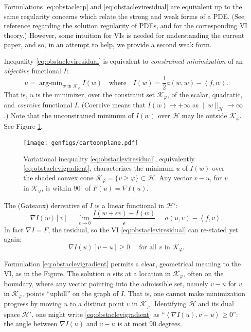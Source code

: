 \documentclass[letterpaper,final,12pt,reqno]{amsart}
\theoremstyle{claim}
\newcommand{\eps}{\epsilon}
\newcommand{\grad}{\nabla}
\newcommand{\ip}[2]{\left<#1,#2\right>}
\numberwithin{equation}{section}
\numberwithin{figure}{section}
\numberwithin{table}{section}
\numberwithin{theorem}{section}
\begin{document}
Formulations \eqref{eq:obstaclecp} and \eqref{eq:obstacleviresidual} are equivalent up to the same regularity concerns which relate the strong and weak forms of a PDE.  (See reference \cite{Evans2010} regarding the solution regularity of PDEs, and \cite{KinderlehrerStampacchia1980} for the corresponding VI theory.)  However, some intuition for VIs is needed for understanding the current paper, and so, in an attempt to help, we provide a second weak form.

Inequality \eqref{eq:obstacleviresidual} is equivalent to \emph{constrained minimization} of an \emph{objective} functional $I$:
\newcommand{\argmin}{\mathop{\mathrm{arg\text{-}min}}}
\begin{equation}
  u = \argmin_{w \text{ in } \mathcal{K}_\varphi} I(w) \quad \text{where} \quad I(w) = \frac{1}{2} a(w,w) - \ip{f}{w}. \label{eq:obstaclemin}
\end{equation}
That is, $u$ is the minimizer, over the constraint set $\mathcal{K}_\varphi$, of the scalar, quadratic, and \emph{coercive} functional $I$.  (Coercive means that $I(w) \to +\infty$ as $\|w\|_{\mathcal{H}} \to \infty$ \cite{Evans2010}.)  Note that the unconstrained minimum of $I(w)$ over $\mathcal{H}$ may lie outside $\mathcal{K}_\varphi$.  See Figure \ref{fig:cartoonplane}.

\begin{figure}
\texttt{[image: genfigs/cartoonplane.pdf]}
\caption{Variational inequality \eqref{eq:obstacleviresidual}, equivalently \eqref{eq:obstaclevigradient}, characterizes the minimum $u$ of $I(w)$ over the shaded convex cone $\mathcal{K}_\varphi=\{v\ge \varphi\} \subset \mathcal{H}$.  Any vector $v-u$, for $v$ in $\mathcal{K}_\varphi$, is within $90^\circ$ of $F(u) = \grad I(u)$.}
\label{fig:cartoonplane}
\end{figure}

The (Gateaux) derivative of $I$ is a linear functional in $\mathcal{H}'$:
\begin{equation}
  \grad I(w)[v] = \lim_{\eps\to 0} \frac{I(w+\eps v) - I(w)}{\eps} = a(u,v) - \ip{f}{v}.  \label{eq:gradobjective}
\end{equation}
In fact $\nabla I = F$, the residual, so the VI \eqref{eq:obstacleviresidual} can re-stated yet again:
\begin{equation}
  \nabla I(u)[v-u] \ge 0 \quad \text{ for all } v \text{ in } \mathcal{K}_\varphi. \label{eq:obstaclevigradient}
\end{equation}

Formulation \eqref{eq:obstaclevigradient} permits a clear, geometrical meaning to the VI, as in the Figure.  The solution $u$ sits at a location in $\mathcal{K}_\varphi$, often on the boundary, where any vector pointing into the admissible set, namely $v-u$ for $v$ in $\mathcal{K}_\varphi$, points ``uphill'' on the graph of $I$.  That is, one cannot make minimization progress by moving $u$ to a distinct point $v$ in $\mathcal{K}_\varphi$.  Identifying $\mathcal{H}$ and its dual space $\mathcal{H}'$, one might write \eqref{eq:obstaclevigradient} as ``$\ip{\nabla I(u)}{v-u} \ge 0$'': the angle between $\nabla I(u)$ and $v-u$ is at most 90 degrees.
\end{document}
